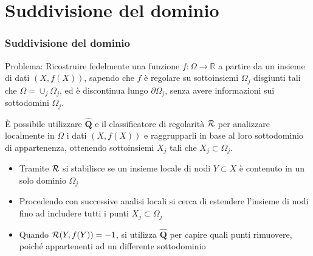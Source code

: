 \documentclass[10pt]{beamer}
\theoremstyle{definition}
\theoremstyle{plain}
\def\R{\mathbb R}
\def\Cal#1{{\cal #1}}
\def\line#1{\hbox to\hsize{#1}}
\begin{document}
\section{Suddivisione del dominio}
\begin{frame}
\frametitle{Suddivisione del dominio}
\alert{Problema}:  Ricostruire  fedelmente una funzione $f:\Omega\to\R$ a partire da un insieme di dati $(X, f(X))$, sapendo che $f$ è regolare su sottoinsiemi $\Omega_j$ disgiunti tali che $\Omega = \cup_j \Omega_j$, ed è discontinua lungo $\partial \Omega_j$, senza avere informazioni sui sottodomini $\Omega_j$.

\bigskip

È possibile utilizzare $\widehat{\bm Q}$ e il classificatore di regolarità $\Cal R$ per analizzare localmente in $\Omega$ i dati $(X, f(X))$ e raggrupparli in base al loro sottodominio di appartenenza, ottenendo sottoinsiemi $X_j$ tali che $X_j\subset \Omega_j$.
\begin{itemize} 
\item
Tramite $\Cal R$ si stabilisce se un insieme locale di nodi $Y \subset X$ è contenuto in un solo dominio $\Omega_j$
\item
Procedendo con successive analisi locali si cerca di estendere l’insieme di nodi fino ad includere tutti i punti $X_j\subset\Omega_j$
\item
Quando $\Cal R(Y, f(Y)) = -1$, si utilizza $\widehat{\bm Q}$ per capire quali punti rimuovere, poiché  appartenenti ad un differente  sottodominio 
\end{itemize}
\end{frame}


\end{document}
